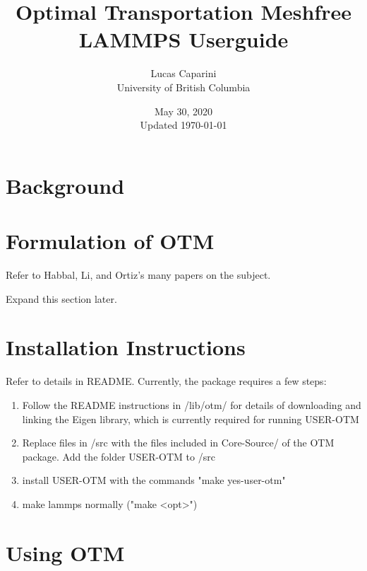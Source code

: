 \documentclass{article}
\begin{document}
	\title{Optimal Transportation Meshfree\\LAMMPS Userguide}
	\author{Lucas Caparini\\University of British Columbia}
	\date{May 30, 2020\\Updated \today}
	\maketitle
	
	\tableofcontents
	\newpage
	
	
	
	
	
	
	\section{Background}
	
	
	
	
	
	
	
	\section{Formulation of OTM}
	Refer to Habbal, Li, and Ortiz's many papers on the subject. 
	
	Expand this section later.
	
	
	\section{Installation Instructions} 
	Refer to details in README. Currently, the package requires a few steps:
	\begin{enumerate}
	\item Follow the README instructions in /lib/otm/ for details of downloading and linking the Eigen library, which is currently required for running USER-OTM
	\item Replace files in /src with the files included in Core-Source/ of the OTM package. Add the folder USER-OTM to /src
	\item install USER-OTM with the commands "make yes-user-otm"
	\item make lammps normally ("make <opt>")
	\end{enumerate}

	
	
	
	
	
	
	
	
	
	\section{Using OTM}
		
\end{document}
